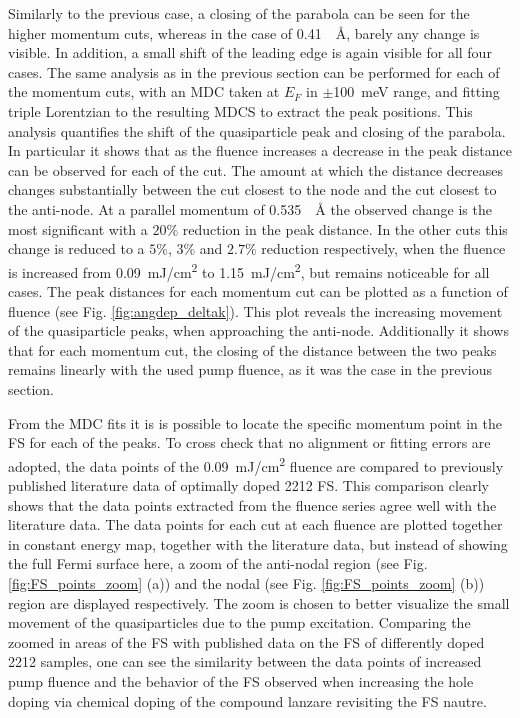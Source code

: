 Similarly to the previous case, a closing of the parabola can be seen for the higher momentum cuts, whereas in the case of \qty{0.41}{\per\angstrom}, barely any change is visible.
In addition, a small shift of the leading edge is again visible for all four cases.
The same analysis as in the previous section can be performed for each of the momentum cuts, with an MDC taken at $E_F$ in $\pm$\qty{100}{\milli\electronvolt} range, and fitting triple Lorentzian to the resulting MDCS to extract the peak positions.
This analysis quantifies the shift of the quasiparticle peak and closing of the parabola.
In particular it shows that as the fluence increases a decrease in the peak distance can be observed for each of the cut.
The amount at which the distance decreases changes substantially between the cut closest to the node and the cut closest to the anti-node.
At a parallel momentum of \qty{0.535}{\per\angstrom} the observed change is the most significant with a $20\%$ reduction in the peak distance.
In the other cuts this change is reduced to a $5\%$, $3\%$ and $2.7\%$ reduction respectively, when the fluence is increased from \qty{0.09}{\milli\joule/\centi\meter\squared} to \qty{1.15}{\milli\joule/\centi\meter\squared}, but remains noticeable for all cases.
The peak distances for each momentum cut can be plotted as a function of fluence (see Fig. \ref{fig:angdep_deltak}).
This plot reveals the increasing movement of the quasiparticle peaks, when approaching the anti-node.
Additionally it shows that for each momentum cut, the closing of the distance between the two peaks remains linearly with the used pump fluence, as it was the case in the previous section.

From the MDC fits it is is possible to locate the specific momentum point in the FS for each of the peaks.
To cross check that no alignment or fitting errors are adopted, the data points of the \qty{0.09}{\milli\joule/\centi\meter\squared} fluence are compared to previously published literature data of optimally doped 2212 FS.
This comparison clearly shows that the data points extracted from the fluence series agree well with the literature data.
The data points for each cut at each fluence are plotted together in constant energy map, together with the literature data, but instead of showing the full Fermi surface here, a zoom of the anti-nodal region (see Fig. \ref{fig:FS_points_zoom} (a)) and the nodal (see Fig. \ref{fig:FS_points_zoom} (b)) region are displayed respectively.
The zoom is chosen to better visualize the small movement of the quasiparticles due to the pump excitation.
Comparing the zoomed in areas of the FS with published data on the FS of differently doped 2212 samples, one can see the similarity between the data points of increased pump fluence and the behavior of the FS observed when increasing the hole doping via chemical doping of the compound \cite{} lanzare revisiting the FS nautre.

